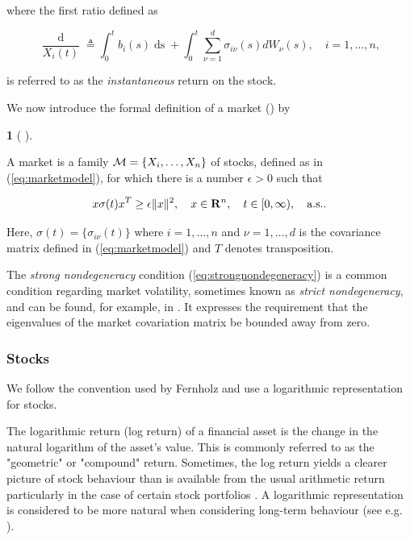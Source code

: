 \documentclass[british]{amsart} \usepackage{lmodern}
\numberwithin{equation}{section} \numberwithin{figure}{section}
\theoremstyle{plain} \newtheorem{thm}{\protect\theoremname}[section]
\theoremstyle{definition} \newtheorem{defn}[thm]{\protect\definitionname}
\theoremstyle{plain} \newtheorem{assumption}[thm]{\protect\assumptionname}
\theoremstyle{plain} \newtheorem{lem}[thm]{\protect\lemmaname}
\theoremstyle{plain} \newtheorem{prop}[thm]{\protect\propositionname}
\theoremstyle{remark} \newtheorem{rem}[thm]{\protect\remarkname}
\theoremstyle{plain} \newtheorem{cor}[thm]{\protect\corollaryname}
\renewcommand{\d}[1]{\mathop{\mathrm{d}{#1}}}
\newcommand{\defeq}{\mathop{\triangleq}} \newcommand{\almostsurely}{\text{a.s.}}
\newcommand{\rangei}{i=1,\dots,n} \newcommand{\measure}{\mathbb{P}}
\begin{document}
where the first ratio defined as

\begin{equation*}
  \frac{\d{X_{i}(t)}}{X_{i}(t)} \defeq 
  \int_{0}^{t} b_{i}(s)\d{s} + 
  \int_{0}^{t} \sum_{\nu=1}^{d} \sigma_{i\nu}(s) dW_{\nu}(s),
  \quad \rangei,
\end{equation*}

is referred to as the \textit{instantaneous} return on the stock.

We now introduce the formal definition of a market (\market) by 

\begin{defn} 
[
  {\cite[Definition 2.2]{fernholz1999pgf}}
]
\label{def:market}

A market is a family $\mathcal{M} = \{X_{i},\dots,X_{n}\}$ of stocks, defined as in
(\ref{eq:marketmodel}), for which there is a number $\epsilon>0$ such that

\begin{equation}
  \label{eq:strongnondegeneracy}
  x \sigma(t) x^{T} \ge \epsilon \|x\|^{2}, 
  \quad x \in \mathbf{R}^{n}, 
  \quad \ranget,
  \quad \almostsurely.
\end{equation}

Here, $\sigma(t) = \{\sigma_{i\nu}(t)\}$ where $\rangei$ and $\nu=1,\dots,d$ is the
covariance matrix defined in (\ref{eq:marketmodel}) and $T$ denotes
transposition.

\end{defn}

The \textit{strong nondegeneracy} condition (\ref{eq:strongnondegeneracy}) is a 
common condition regarding market volatility, sometimes known as \textit{strict
nondegeneracy}, and can be found, for example, in \cite{shreve1991}. It 
expresses the requirement that the eigenvalues of the market covariation 
matrix be bounded away from zero. 

\subsubsection{Stocks}

We follow the convention used by Fernholz and use a logarithmic representation
for stocks.

The logarithmic return (log return) of a financial asset is the change in the
natural logarithm of the asset's value. This is commonly referred to as the
"geometric" or "compound" return. Sometimes, the log return yields a clearer
picture of stock behaviour than is available from the usual arithmetic return
particularly in the case of certain stock portfolios
\cite{fernholz2007statistics}. A logarithmic representation is considered to be
more natural when considering long-term behaviour (see e.g.
\cite{fernholz1982}).
\end{document}
